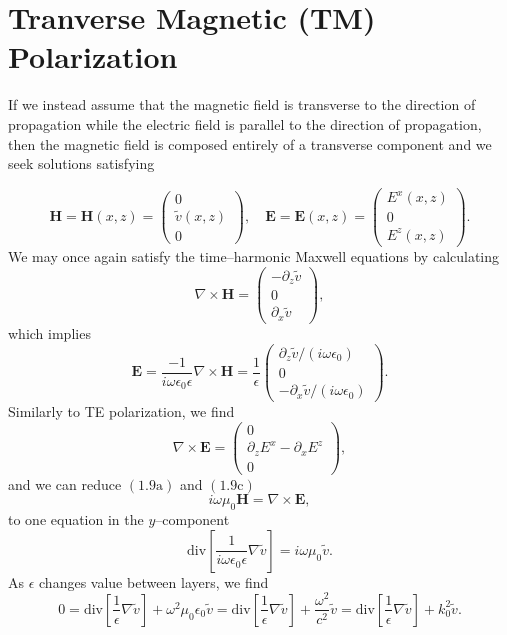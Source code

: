 \section{Tranverse Magnetic (TM) Polarization}
\label{intro:tm_polarization}
If we instead assume that the magnetic field is transverse to the direction of propagation while the electric field is parallel to the direction of propagation, then the magnetic field is composed entirely of a transverse component and we seek solutions satisfying

\begin{equation}
\textbf{H}=\textbf{H}(x,z)=\begin{pmatrix}
0\\ \tilde{v}(x,z) \\ 0
\end{pmatrix},\quad 
\textbf{E}=\textbf{E}(x,z)=\begin{pmatrix}
E^x(x,z)\\ 0 \\ E^z(x,z)
\end{pmatrix}.
\end{equation}
We may once again satisfy the time--harmonic Maxwell equations by calculating
$$\nabla \times \textbf{H}= \begin{pmatrix}
-\partial_z \tilde{v}\\ 0 \\ \partial_x \tilde{v}
\end{pmatrix},$$
which implies
$$\textbf{E} = \frac{-1}{i\omega\epsilon_0\epsilon}\nabla \times \textbf{H} =\frac{1}{\epsilon}\begin{pmatrix}
\partial_z \tilde{v}/(i\omega\epsilon_0)\\ 0 \\ -\partial_x \tilde{v}/(i\omega\epsilon_0)
\end{pmatrix}.$$
Similarly to TE polarization, we find
$$\nabla \times \textbf{E}=\begin{pmatrix}
0\\ \partial_z E^x - \partial_x E^z \\ 0
\end{pmatrix},$$
and we can reduce $(1.9\text{a})$ and $(1.9\text{c})$
$$i\omega\mu_0 \textbf{H} = \nabla \times \textbf{E},$$
to one equation in the $y$--component
$$\text{div}\left[\frac{1}{i\omega \epsilon_0\epsilon}\nabla \tilde{v}\right]=  i\omega \mu_0 \tilde{v}.$$
As $\epsilon$ changes value between layers, we find
\begin{equation}
 0=\text{div}\left[\frac{1}{\epsilon}\nabla \tilde{v}\right] + \omega^2\mu_0\epsilon_0\tilde{v} = \text{div}\left[\frac{1}{\epsilon}\nabla \tilde{v}\right]+\frac{\omega^2}{c^2}\tilde{v}=\text{div}\left[\frac{1}{\epsilon}\nabla \tilde{v}\right]+k_0^2\tilde{v}. 
\end{equation}
